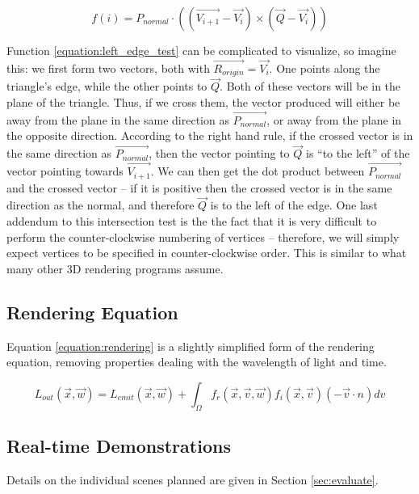 \documentclass[11pt]{article}
\newcommand{\rayorg}{\vec{R_{origin}}}
\begin{document}
\begin{equation}
  \label{equation:left_edge_test}
  f(i) = P_{normal} \cdot ((\vec{V_{i+1}} - \vec{V_i}) \times (\vec{Q} - \vec{V_i}))
\end{equation}

Function \ref{equation:left_edge_test} can be complicated to visualize, so imagine this: we first form two vectors, both with $\rayorg = \vec{V_i}$.
One points along the triangle's edge, while the other points to $\vec{Q}$.
Both of these vectors will be in the plane of the triangle.
Thus, if we cross them, the vector produced will either be away from the plane in the same direction as $\vec{P_{normal}}$, or away from the plane in the opposite direction.
According to the right hand rule, if the crossed vector is in the same direction as $\vec{P_{normal}}$, then the vector pointing to $\vec{Q}$ is ``to the left'' of the vector pointing towards $\vec{V_{i+1}}$.
We can then get the dot product between $\vec{P_{normal}}$ and the crossed vector -- if it is positive then the crossed vector is in the same direction as the normal, and therefore $\vec{Q}$ is to the left of the edge.
One last addendum to this intersection test is the the fact that it is very difficult to perform the counter-clockwise numbering of vertices -- therefore, we will simply expect vertices to be specified in counter-clockwise order.
This is similar to what many other 3D rendering programs assume.

\subsection{Rendering Equation}
\label{sec:method:rendering_equation}
Equation \ref{equation:rendering} is a slightly simplified form of the rendering equation, removing properties dealing with the wavelength of light and time.

\begin{equation}
  \label{equation:rendering}
  L_{out}(\vec{x}, \vec{w}) = L_{emit}(\vec{x}, \vec{w}) + \int_{\Omega} f_r(\vec{x}, \vec{v},\vec{w})f_i(\vec{x}, \vec{v})(-\vec{v} \cdot n) dv
\end{equation}

\subsection{Real-time Demonstrations}
\label{sec:method:realtime_demo}

Details on the individual scenes planned are given in Section \ref{sec:evaluate}.
\end{document}
